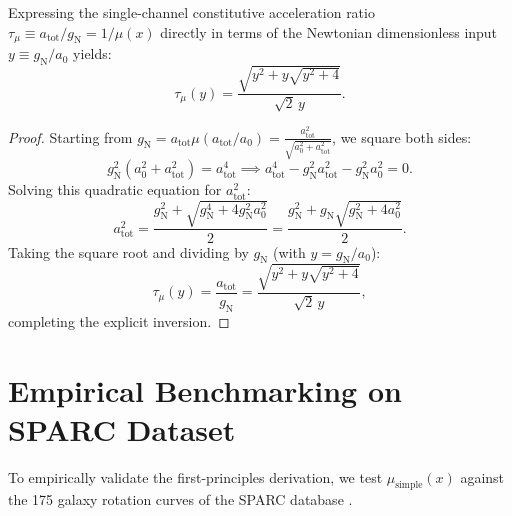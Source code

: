 \documentclass[11pt]{article}
\theoremstyle{definition}
\theoremstyle{remark}
\begin{document}
\begin{corollary}
Expressing the single-channel constitutive acceleration ratio $\tau_\mu \equiv a_{\text{tot}} / g_{\text{N}} = 1/\mu(x)$ directly in terms of the Newtonian dimensionless input $y \equiv g_{\text{N}} / a_0$ yields:
\begin{equation}
\tau_\mu(y) = \frac{\sqrt{y^2 + y\sqrt{y^2+4}}}{\sqrt{2}\,y}.
\end{equation}
\end{corollary}

\begin{proof}
Starting from $g_{\text{N}} = a_{\text{tot}} \mu(a_{\text{tot}}/a_0) = \frac{a_{\text{tot}}^2}{\sqrt{a_0^2 + a_{\text{tot}}^2}}$, we square both sides:
\begin{equation}
g_{\text{N}}^2 (a_0^2 + a_{\text{tot}}^2) = a_{\text{tot}}^4 \implies a_{\text{tot}}^4 - g_{\text{N}}^2 a_{\text{tot}}^2 - g_{\text{N}}^2 a_0^2 = 0.
\end{equation}
Solving this quadratic equation for $a_{\text{tot}}^2$:
\begin{equation}
a_{\text{tot}}^2 = \frac{g_{\text{N}}^2 + \sqrt{g_{\text{N}}^4 + 4 g_{\text{N}}^2 a_0^2}}{2} = \frac{g_{\text{N}}^2 + g_{\text{N}}\sqrt{g_{\text{N}}^2 + 4 a_0^2}}{2}.
\end{equation}
Taking the square root and dividing by $g_{\text{N}}$ (with $y = g_{\text{N}}/a_0$):
\begin{equation}
\tau_\mu(y) = \frac{a_{\text{tot}}}{g_{\text{N}}} = \frac{\sqrt{y^2 + y\sqrt{y^2+4}}}{\sqrt{2}\,y},
\end{equation}
completing the explicit inversion.
\end{proof}

\section{Empirical Benchmarking on SPARC Dataset}

To empirically validate the first-principles derivation, we test $\mu_{\text{simple}}(x)$ against the 175 galaxy rotation curves of the SPARC database \cite{SPARC2016}. 
\end{document}

